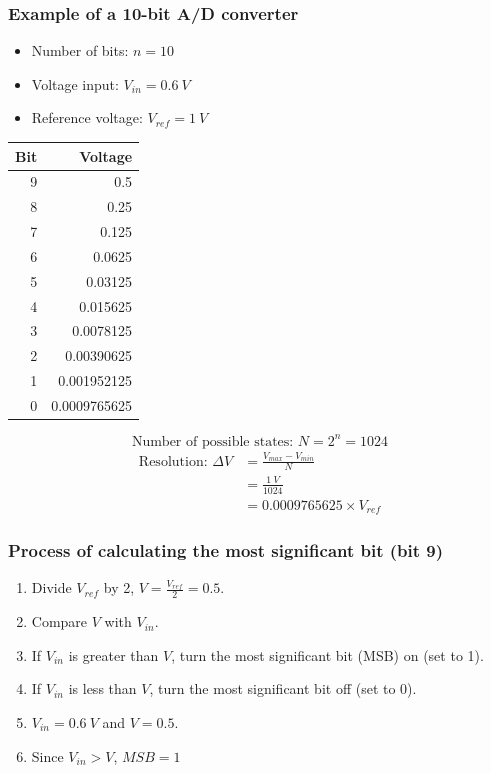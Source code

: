 \documentclass[11pt]{article}
\begin{document}
\subsubsection{Example of a 10-bit A/D converter}
\label{sec:org77e9bea}
\begin{itemize}
\item Number of bits: \(n = 10\)
\item Voltage input: \(V_{in} = \qty{0.6}{V}\)
\item Reference voltage: \(V_{ref} = \qty{1}{V}\)
\end{itemize}

\begin{center}
\begin{tabular}{rr}
Bit & Voltage\\
\hline
9 & 0.5\\
8 & 0.25\\
7 & 0.125\\
6 & 0.0625\\
5 & 0.03125\\
4 & 0.015625\\
3 & 0.0078125\\
2 & 0.00390625\\
1 & 0.001952125\\
0 & 0.0009765625\\
\end{tabular}
\end{center}

\[\text{Number of possible states: } N = 2^n = 1024\]
\begin{align*}
\text{Resolution: } \Delta V &= \frac{V_{max} - V_{min}}{N} \\
&= \frac{\qty{1}{V}}{1024} \\
&= 0.0009765625 \times V_{ref}
\end{align*}

 \newpage
\subsubsection{Process of calculating the most significant bit (bit 9)}
\label{sec:org844c7db}
\begin{enumerate}
\item Divide \(V_{ref}\) by 2, \(V = \frac{V_{ref}}{2} = 0.5\).
\item Compare \(V\) with \(V_{in}\).
\item If \(V_{in}\) is greater than \(V\), turn the most significant bit (MSB) on (set to 1).
\item If \(V_{in}\) is less than \(V\), turn the most significant bit off (set to 0).
\item \(V_{in} = \qty{0.6}{V}\) and \(V = 0.5\).
\item Since \(V_{in} > V\), \(MSB = 1\)
\end{enumerate}
\end{document}
